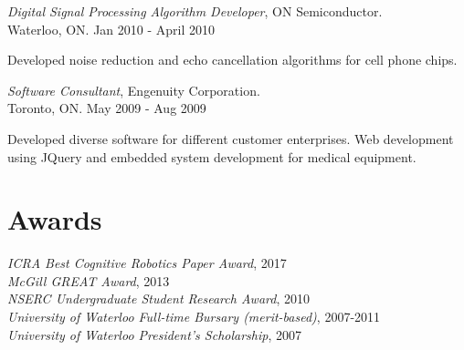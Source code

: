 \documentclass[line,margin,letterpaper]{res}
\begin{document}
\begin{resume}
{\sl Digital Signal Processing Algorithm Developer}, ON Semiconductor.
\\ \hfill Waterloo, ON. Jan 2010 - April 2010
\begin{list}{}
\item Developed noise reduction and echo cancellation algorithms for cell phone chips.
\end{list}

{\sl Software Consultant}, Engenuity Corporation.
\\ \hfill Toronto, ON. May 2009 - Aug 2009
\begin{list}{}
\item Developed diverse software for different customer enterprises. Web development using JQuery and embedded system development for medical equipment.
\end{list}
\fi


\section{Awards}
{\sl ICRA Best Cognitive Robotics Paper Award}, 2017
\\
{\sl McGill GREAT Award}, 2013
\\
{\sl NSERC Undergraduate Student Research Award}, 2010
\\
{\sl University of Waterloo Full-time Bursary (merit-based)}, 2007-2011
\\
{\sl University of Waterloo President's Scholarship}, 2007

\iffalse
\section{References}

\textbf{Leslie Pack Kaelbling} {\small lpk@mit.edu}\\
Panasonic Professor of Computer Science and Engineering, MIT

\textbf{Tom\'{a}s Lozano-P\'{e}rez} {\small tlp@mit.edu}\\
School of Engineering Professor in Teaching Excellence, MIT

\textbf{Joelle Pineau} {\small jpineau@cs.mcgill.ca}\\
Associate Professor, McGill University

\textbf{Doina Precup} {\small dprecup@cs.mcgill.ca}\\
Associate Professor, McGill University
\fi
\end{resume}
\end{document}
